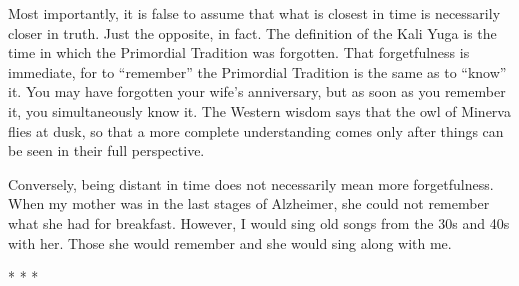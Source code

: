 Most importantly, it is false to assume that what is closest in time is necessarily closer in truth. Just the opposite, in fact. The definition of the Kali Yuga is the time in which the Primordial Tradition was forgotten. That forgetfulness is immediate, for to ``remember'' the Primordial Tradition is the same as to ``know'' it. You may have forgotten your wife's anniversary, but as soon as you remember it, you simultaneously know it. The Western wisdom says that the owl of Minerva flies at dusk, so that a more complete understanding comes only after things can be seen in their full perspective.

Conversely, being distant in time does not necessarily mean more forgetfulness. When my mother was in the last stages of Alzheimer, she could not remember what she had for breakfast. However, I would sing old songs from the 30s and 40s with her. Those she would remember and she would sing along with me.



\begin{center}* * *\end{center}

